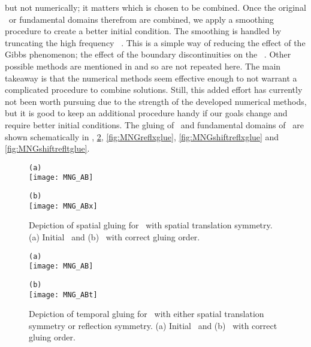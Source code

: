 but not numerically; it matters which is chosen to be combined.
Once the original \twots\ or fundamental domains therefrom are combined,
we apply a smoothing procedure to create a better initial condition.
The smoothing is handled by truncating the high frequency \spt\ \Fcs.
This is a simple way
of reducing the effect of the Gibbs phenomenon; the effect of the boundary
discontinuities on the \spt\ \Fcs. Other possible methods are
mentioned in  and so are not repeated here. The main
takeaway is that the numerical methods seem effective enough to not
warrant a complicated procedure to combine solutions.
Still, this added effort has currently not been worth
pursuing due to the strength of the developed numerical methods, but
it is good to keep an additional procedure handy if our goals
change and require better initial conditions.
The gluing of \twots\ and fundamental domains of \twots\ are shown
schematically in , \ref{fig:MNGtimeglue},
\ref{fig:MNGreflxglue}, \ref{fig:MNGshiftreflxglue} and \ref{fig:MNGshiftrefltglue}.


\begin{figure}
\begin{minipage}[height=.1\textheight]{.45\textwidth}
\centering
\small{\texttt{(a)}} \\
\texttt{[image: MNG\_AB]}
\end{minipage}
\begin{minipage}[height=.1\textheight]{.45\textwidth}
\centering
\small{\texttt{(b)}} \\
\texttt{[image: MNG\_ABx]}
\end{minipage}
\caption{ \label{fig:MNGspaceglue}
Depiction of spatial gluing for \twots\ with spatial translation symmetry.
(a) Initial \twots\ and (b) \twots\ with correct gluing order.
}
\end{figure}


\begin{figure}
\begin{minipage}[height=.1\textheight]{.45\textwidth}
\centering
\small{\texttt{(a)}} \\
\texttt{[image: MNG\_AB]}
\end{minipage}
\begin{minipage}[height=.1\textheight]{.45\textwidth}
\centering
\small{\texttt{(b)}} \\
\texttt{[image: MNG\_ABt]}
\end{minipage}
\caption{ \label{fig:MNGtimeglue}
Depiction of temporal gluing for \twots\ with either spatial translation symmetry
or reflection symmetry. (a) Initial
\twots\ and (b) \twots\ with correct gluing order.
}
\end{figure}


